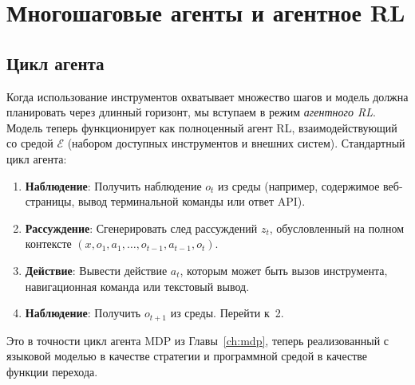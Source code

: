 \section{Многошаговые агенты и агентное RL}
\label{sec:agentic-rl}

\subsection{Цикл агента}

Когда использование инструментов охватывает множество шагов и модель должна планировать через
длинный горизонт, мы вступаем в режим \emph{агентного RL}.
Модель теперь функционирует как полноценный агент RL, взаимодействующий со
средой $\mathcal{E}$ (набором доступных инструментов и
внешних систем). Стандартный цикл агента:

\begin{enumerate}
\item \textbf{Наблюдение}: Получить наблюдение $o_t$ из
  среды (например, содержимое веб-страницы, вывод
  терминальной команды или ответ API).
\item \textbf{Рассуждение}: Сгенерировать след рассуждений $z_t$, обусловленный
  на полном контексте $(x, o_1, a_1, \ldots, o_{t-1}, a_{t-1}, o_t)$.
\item \textbf{Действие}: Вывести действие $a_t$, которым может быть вызов инструмента,
  навигационная команда или текстовый вывод.
\item \textbf{Наблюдение}: Получить $o_{t+1}$ из среды. Перейти к~2.
\end{enumerate}

Это в точности цикл агента MDP из Главы~\ref{ch:mdp}, теперь
реализованный с языковой моделью в качестве стратегии и программной
средой в качестве функции перехода.

